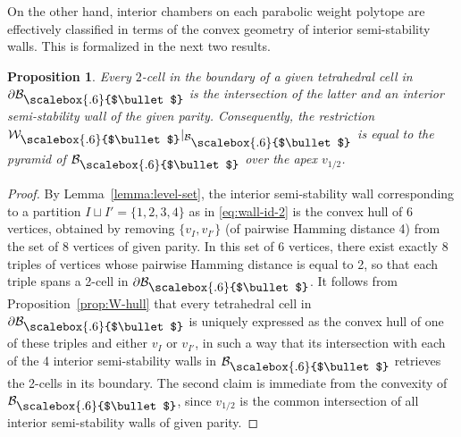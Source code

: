 \documentclass[pdftex]{sigma}
\newcommand\sbul[1][.6]{\mathbin{\vcenter{\hbox{\scalebox{#1}{$\bullet$}}}}}
\newcommand{\qB}{\mathcal{B}}
\newcommand{\qW}{\mathcal{W}}
\numberwithin{equation}{section}
\newtheorem{Proposition}[Theorem]{Proposition}
 { \theoremstyle{definition}
\newtheorem{Definition}[Theorem]{Definition}
\newtheorem{Note}[Theorem]{Note}
\newtheorem{Example}[Theorem]{Example}
\newtheorem{Remark}[Theorem]{Remark} }
\begin{document}
On the other hand, interior chambers on each parabolic weight polytope are effectively classified in terms of the convex geometry of interior semi-stability walls.
This is formalized in the next two results.

 \begin{Proposition}\label{prop:int-w}
Every $2$-cell in the boundary of a given tetrahedral cell in $\partial\qB_{\sbul}$ is the intersection of the latter and an interior semi-stability wall of the given parity. Consequently, the restriction $\qW_{\sbul}\vert_{\qB_{\sbul}}$ is equal to the pyramid of $\qB_{\sbul}$ over the apex $v_{1/2}$.
\end{Proposition}

\begin{proof}
By Lemma~\ref{lemma:level-set}, the interior semi-stability wall corresponding to a partition $I\sqcup I' = \{1,2,3,4\}$ as in \eqref{eq:wall-id-2} is the convex hull of 6 vertices, obtained by removing $\{v_{I}, v_{I'}\}$ (of pairwise Hamming distance 4) from the set of 8 vertices of given parity. In this set of 6 vertices, there exist exactly 8 triples of vertices whose pairwise Hamming distance is equal to 2, so that each triple spans a 2-cell in $\partial \qB_{\sbul}$. It follows from Proposition~\ref{prop:W-hull} that every tetrahedral cell in $\partial \qB_{\sbul}$ is uniquely expressed as the convex hull of one of these triples and either $v_{I}$ or $v_{I'}$, in such a way that its intersection with each of the 4 interior semi-stability walls in $\qB_{\sbul}$ retrieves the 2-cells in its boundary. The second claim is immediate from the convexity of $\qB_{\sbul}$, since $v_{1/2}$ is the common intersection of all interior semi-stability walls of given parity.
\end{proof}
\end{document}
